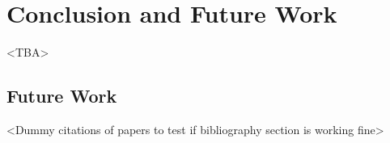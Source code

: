 \chapter{Conclusion and Future Work}\label{chapter:conclusion and future}
<TBA>
\section{Future Work}
<Dummy citations of papers to test if bibliography section is working fine>
\parencite{felix}
\parencite{laxmikant}
\parencite{nikolas}
\parencite{rudolph}
\parencite{isaias}
\parencite{andreas}
\parencite{georgiou}
\parencite{travis}
\parencite{gladys}
\parencite{klein}
\parencite{pavan}
\parencite{jette}
\parencite{abhishek}
\parencite{david}
\parencite{joseph}
\parencite{hungershofer}
\parencite{yangjie}
\parencite{zhou}
\parencite{lucero}
\parencite{desai}
\parencite{yang}
\parencite{daniel}
\parencite{dror}
\parencite{ahuva}
\parencite{dinesh}
\parencite{slurm}
